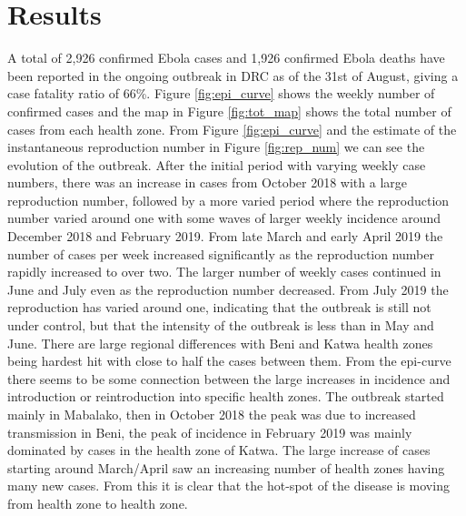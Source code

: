 \documentclass[12pt]{article}
\begin{document}
\section{Results}

A total of 2,926 confirmed Ebola cases and 1,926 confirmed Ebola deaths have been reported in the ongoing outbreak in DRC as of the 31st of August, giving a case fatality ratio of 66\%. Figure \ref{fig:epi_curve} shows the weekly number of confirmed cases and the map in Figure \ref{fig:tot_map} shows the total number of cases from each health zone. From Figure \ref{fig:epi_curve} and the estimate of the instantaneous reproduction number in Figure \ref{fig:rep_num} we can see the evolution of the outbreak. After the initial period with varying weekly case numbers, there was an increase in cases from October 2018 with a large reproduction number, followed by a more varied period where the reproduction number varied around one with some waves of larger weekly incidence around December 2018 and February 2019. From late March and early April 2019 the number of cases per week increased significantly as the reproduction number rapidly increased to over two. The larger number of weekly cases continued in June and July even as the reproduction number decreased. From July 2019 the reproduction has varied around one, indicating that the outbreak is still not under control, but that the intensity of the outbreak is less than in May and June. There are large regional differences with Beni and Katwa health zones being hardest hit with close to half the cases between them. From the epi-curve there seems to be some connection between the large increases in incidence and introduction or reintroduction into specific health zones. The outbreak started mainly in Mabalako, then in October 2018 the peak was due to increased transmission in Beni, the peak of incidence in February 2019 was mainly dominated by cases in the health zone of Katwa. The large increase of cases starting around March/April saw an increasing number of health zones having many new cases. From this it is clear that the hot-spot of the disease is moving from health zone to health zone.
\end{document}
